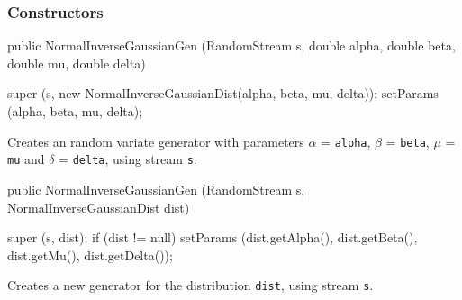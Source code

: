 \subsubsection* {Constructors}
\begin{code}

   public NormalInverseGaussianGen (RandomStream s, double alpha,
                                    double beta, double mu, double delta) \begin{hide} {
      super (s, new NormalInverseGaussianDist(alpha, beta, mu, delta));
      setParams (alpha, beta, mu, delta);
   }\end{hide}
\end{code} 
\begin{tabb} Creates an \nig{} random variate generator with parameters
 $\alpha$ = \texttt{alpha}, $\beta$ = \texttt{beta},  $\mu$ = \texttt{mu}
 and  $\delta$ = \texttt{delta}, using stream \texttt{s}. 
\end{tabb}
\begin{code}

   public NormalInverseGaussianGen (RandomStream s,
                                    NormalInverseGaussianDist dist) \begin{hide} {
      super (s, dist);
      if (dist != null)
         setParams (dist.getAlpha(), dist.getBeta(), dist.getMu(),
                    dist.getDelta());
   }\end{hide}
\end{code}
  \begin{tabb} Creates a new generator for the distribution \texttt{dist},
     using stream \texttt{s}.
  \end{tabb}

